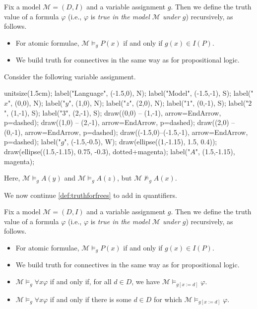 \begin{definition}[Truth] \label{def:truthforfrees}
	Fix a model $\mathcal M=(D,I)$ and a variable assignment $g$. Then we define the truth value of a formula $\varphi$ (i.e., $\varphi$ is \textit{true in the model $\mathcal M$ under $g$}) recursively, as follows.
	\begin{itemize}
		\item For atomic formulae, $\mathcal M\models_gP(x)$ if and only if $g(x)\in I(P)$.
		\item We build truth for connectives in the same way as for propositional logic.
	\end{itemize}
\end{definition}
\begin{example}
	Consider the following variable assignment.
	\begin{center}
		\begin{asy}
			unitsize(1.5cm);
			label("Language", (-1.5,0), N);
			label("Model", (-1.5,-1), S);
			label("$x$", (0,0), N);
			label("$y$", (1,0), N);
			label("$z$", (2,0), N);
			label("$1$", (0,-1), S);
			label("$2$", (1,-1), S);
			label("$3$", (2,-1), S);
			draw((0,0) -- (1,-1), arrow=EndArrow, p=dashed);
			draw((1,0) -- (2,-1), arrow=EndArrow, p=dashed);
			draw((2,0) -- (0,-1), arrow=EndArrow, p=dashed);
			draw((-1.5,0)--(-1.5,-1), arrow=EndArrow, p=dashed);
			label("$g$", (-1.5,-0.5), W);
			draw(ellipse((1,-1.15), 1.5, 0.4));
			draw(ellipse((1.5,-1.15), 0.75, -0.3), dotted+magenta);
			label("$A$", (1.5,-1.15), magenta);
		\end{asy}
	\end{center}
	Here, $\mathcal M\models_gA(y)$ and $\mathcal M\models_gA(z)$, but $\mathcal M\not\models_gA(x)$.
\end{example}
We now continue \autoref{def:truthforfrees} to add in quantifiers.
\begin{defihelper}[Truth]
	Fix a model $\mathcal M=(D,I)$ and a variable assignment $g$. Then we define the truth value of a formula $\varphi$ (i.e., $\varphi$ is \textit{true in the model $\mathcal M$ under $g$}) recursively, as follows.
	\begin{itemize}
		\item For atomic formulae, $\mathcal M\models_gP(x)$ if and only if $g(x)\in I(P)$.
		\item We build truth for connectives in the same way as for propositional logic.
		\item $\mathcal M\models_g\forall x\varphi$ if and only if, for all $d\in D$, we have $\mathcal M\models_{g[x:=d]}\varphi$.
		\item $\mathcal M\models_g\forall x\varphi$ if and only if there is some $d\in D$ for which $\mathcal M\models_{g[x:=d]}\varphi$.
	\end{itemize}
\end{defihelper}
